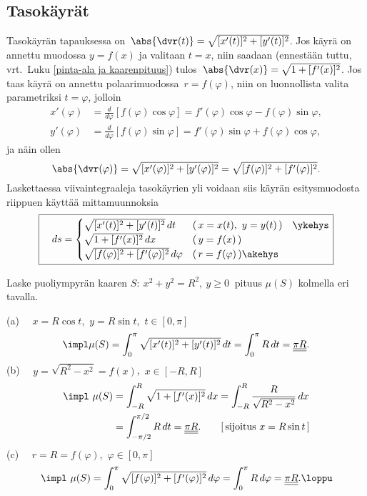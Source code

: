 \subsection*{Tasokäyrät}

Tasokäyrän tapauksessa on $\,\abs{\dvr(t)}=\sqrt{[x'(t)]^2+[y'(t)]^2}$.
Jos käyrä on annettu muodossa $y=f(x)$ ja valitaan $t=x$, niin saadaan 
(ennestään tuttu, vrt.\ Luku \ref{pinta-ala ja kaarenpituus}) tulos
$\,\abs{\dvr(x)}=\sqrt{1+[f'(x)]^2}$. Jos taas käyrä on annettu polaarimuodossa
$\,r=f(\varphi)$, niin on luonnollista valita parametriksi $t=\varphi$, jolloin
\begin{align*}
x'(\varphi) &= \frac{d}{d\varphi}[f(\varphi)\cos\varphi]
             = f'(\varphi)\cos\varphi-f(\varphi)\sin\varphi, \\
y'(\varphi) &= \frac{d}{d\varphi}[f(\varphi)\sin\varphi]
             = f'(\varphi)\sin\varphi+f(\varphi)\cos\varphi,
\end{align*}
ja näin ollen
\[
\abs{\dvr(\varphi)}=\sqrt{[x'(\varphi)]^2+[y'(\varphi)]^2}
                   =\sqrt{[f(\varphi)]^2+[f'(\varphi)]^2}.
\]
Laskettaessa viivaintegraaleja tasokäyrien yli voidaan siis käyrän esitysmuodosta riippuen
käyttää mittamuunnoksia
%
\[ \boxed{
\quad ds=\begin{cases}
\sqrt{[x'(t)]^2+[y'(t)]^2}\,dt &(\,x=x(t), \ y=y(t)\,) \quad\ykehys \\
\sqrt{1+[f'(x)]^2}\,dx &(\,y=f(x)\,) \\
\sqrt{[f(\varphi)]^2+[f'(\varphi)]^2}\,d\varphi &(\,r=f(\varphi)\,) \akehys
\end{cases} } \]
\begin{Exa}
Laske puoliympyrän kaaren $S:\ x^2+y^2=R^2,\ y \ge 0\ $ pituus $\mu(S)$ kolmella eri tavalla.
\end{Exa}
\ratk
(a) \ \, $x=R\cos t$, $\,y=R\sin t$, $\,t\in [0,\pi]$
\[
\impl \mu(S)=\int_0^\pi \sqrt{[x'(t)]^2+[y'(t)]^2}\,dt
            =\int_0^\pi R\,dt=\underline{\underline{\pi R}}.
\]
(b) \ \, $y=\sqrt{R^2-x^2}=f(x)$, $\,x\in [-R,R]$
\begin{align*}
\impl \ \mu(S) &= \int_{-R}^R \sqrt{1+[f'(x)]^2}\,dx=\int_{-R}^R \frac{R}{\sqrt{R^2-x^2}}\,dx \\
               &= \int_{-\pi/2}^{\pi/2} R\,dt
                = \underline{\underline{\pi R}}. \qquad [\,\text{sijoitus}\ x=R\sin t\,]
\end{align*}
(c) \ \, $r=R=f(\varphi)$, $\,\varphi\in [0,\pi]$
\[
\impl \ \mu(S)=\int_0^\pi \sqrt{[f(\varphi)]^2+[f'(\varphi)]^2}\,d\varphi
              =\int_0^\pi R\,d\varphi=\underline{\underline{\pi R}}. \loppu
\]


